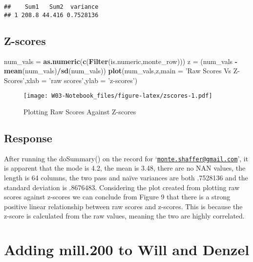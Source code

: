 \documentclass[
]{article}
\newenvironment{Shaded}{\begin{snugshade}}{\end{snugshade}}
\newcommand{\DataTypeTok}[1]{\textcolor[rgb]{0.13,0.29,0.53}{#1}}
\newcommand{\KeywordTok}[1]{\textcolor[rgb]{0.13,0.29,0.53}{\textbf{#1}}}
\newcommand{\NormalTok}[1]{#1}
\newcommand{\OperatorTok}[1]{\textcolor[rgb]{0.81,0.36,0.00}{\textbf{#1}}}
\newcommand{\StringTok}[1]{\textcolor[rgb]{0.31,0.60,0.02}{#1}}
\begin{document}
\begin{verbatim}
##    Sum1   Sum2  variance
## 1 208.8 44.416 0.7528136
\end{verbatim}

\hypertarget{z-scores}{%
\subsection{Z-scores}\label{z-scores}}

\begin{Shaded}
\begin{Highlighting}[]
\NormalTok{num_vals =}\StringTok{ }\KeywordTok{as.numeric}\NormalTok{(}\KeywordTok{c}\NormalTok{(}\KeywordTok{Filter}\NormalTok{(is.numeric,monte_row)))}
\NormalTok{z =}\StringTok{ }\NormalTok{(num_vals }\OperatorTok{-}\StringTok{ }\KeywordTok{mean}\NormalTok{(num_vals)}\OperatorTok{/}\KeywordTok{sd}\NormalTok{(num_vals))}
\KeywordTok{plot}\NormalTok{(num_vals,z,}\DataTypeTok{main =} \StringTok{'Raw Scores Vs Z-Scores'}\NormalTok{,}\DataTypeTok{xlab =} \StringTok{'raw scores'}\NormalTok{,}\DataTypeTok{ylab =} \StringTok{'z-scores'}\NormalTok{)}
\end{Highlighting}
\end{Shaded}

\begin{figure}
\centering
\texttt{[image: W03-Notebook\_files/figure-latex/zscores-1.pdf]}
\caption{Plotting Raw Scores Against Z-scores}
\end{figure}

\hypertarget{response-1}{%
\subsection{Response}\label{response-1}}

After running the doSummary() on the record for
`\href{mailto:monte.shaffer@gmail.com}{\nolinkurl{monte.shaffer@gmail.com}}',
it is apparent that the mode is 4.2, the mean is 3.48, there are no NAN
values, the length is 64 columns, the two pass and naïve variances are
both .7528136 and the standard deviation is .8676483. Considering the
plot created from plotting raw scores against z-scores we can conclude
from Figure 9 that there is a strong positive linear relationship
between raw scores and z-scores. This is because the z-score is
calculated from the raw values, meaning the two are highly correlated.

\hypertarget{adding-mill.200-to-will-and-denzel}{%
\section{Adding mill.200 to Will and
Denzel}\label{adding-mill.200-to-will-and-denzel}}
\end{document}
